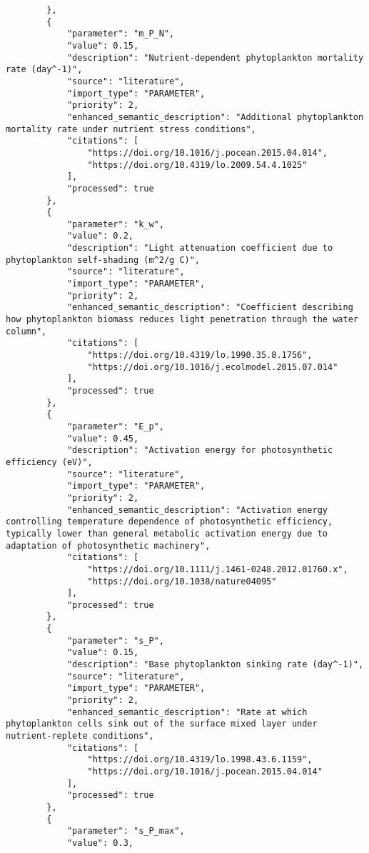 \begin{lstlisting}
        },
        {
            "parameter": "m_P_N",
            "value": 0.15,
            "description": "Nutrient-dependent phytoplankton mortality rate (day^-1)",
            "source": "literature",
            "import_type": "PARAMETER",
            "priority": 2,
            "enhanced_semantic_description": "Additional phytoplankton mortality rate under nutrient stress conditions",
            "citations": [
                "https://doi.org/10.1016/j.pocean.2015.04.014",
                "https://doi.org/10.4319/lo.2009.54.4.1025"
            ],
            "processed": true
        },
        {
            "parameter": "k_w",
            "value": 0.2,
            "description": "Light attenuation coefficient due to phytoplankton self-shading (m^2/g C)",
            "source": "literature",
            "import_type": "PARAMETER",
            "priority": 2,
            "enhanced_semantic_description": "Coefficient describing how phytoplankton biomass reduces light penetration through the water column",
            "citations": [
                "https://doi.org/10.4319/lo.1990.35.8.1756",
                "https://doi.org/10.1016/j.ecolmodel.2015.07.014"
            ],
            "processed": true
        },
        {
            "parameter": "E_p",
            "value": 0.45,
            "description": "Activation energy for photosynthetic efficiency (eV)",
            "source": "literature",
            "import_type": "PARAMETER",
            "priority": 2,
            "enhanced_semantic_description": "Activation energy controlling temperature dependence of photosynthetic efficiency, typically lower than general metabolic activation energy due to adaptation of photosynthetic machinery",
            "citations": [
                "https://doi.org/10.1111/j.1461-0248.2012.01760.x",
                "https://doi.org/10.1038/nature04095"
            ],
            "processed": true
        },
        {
            "parameter": "s_P",
            "value": 0.15,
            "description": "Base phytoplankton sinking rate (day^-1)",
            "source": "literature",
            "import_type": "PARAMETER",
            "priority": 2,
            "enhanced_semantic_description": "Rate at which phytoplankton cells sink out of the surface mixed layer under nutrient-replete conditions",
            "citations": [
                "https://doi.org/10.4319/lo.1998.43.6.1159",
                "https://doi.org/10.1016/j.pocean.2015.04.014"
            ],
            "processed": true
        },
        {
            "parameter": "s_P_max",
            "value": 0.3,

\end{lstlisting}
